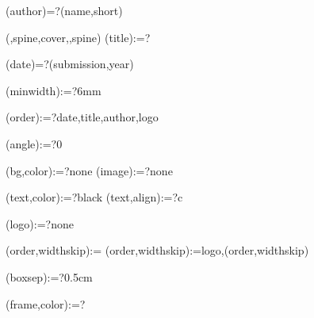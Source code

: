 
%


\makeatletter


% 

\spine(author)=?{\thedocauthor(name,short)}

({\@LANG@COVER,spine,cover},{\@LANG@COVER,spine})%
\spine(title):=?{\match}

\spine(date)=?{\thentdocdate(submission,year)}


\spine(minwidth):=?{6mm}

\spine(order):=?{date,title,author,logo}

\spine(angle):=?{0}

\spine(bg,color):=?{none}
\spine(image):=?{none}

\spine(text,color):=?{black}
\spine(text,align):=?{c}

\spine(logo):=?{none}

\spine(order,widthskip):={}
\spine(order,widthskip):={logo,\thespine(order,widthskip)}

\spine(boxsep):=?{0.5cm}

\spine(frame,color):=?{}

